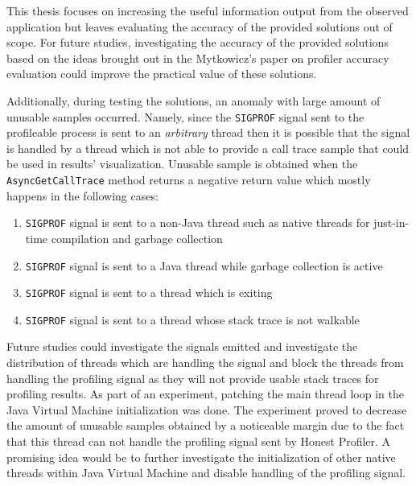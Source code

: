\documentclass[..thesis.tex]{subfiles}
\begin{document}
This thesis focuses on increasing the useful information output from the observed application but leaves evaluating the accuracy of the provided solutions out of scope. For future studies, investigating the accuracy of the provided solutions based on the ideas brought out in the Mytkowicz's paper on profiler accuracy evaluation \cite{mytkowicz_evaluating_2010} could improve the practical value of these solutions.


Additionally, during testing the solutions, an anomaly with large amount of unusable samples occurred. Namely, since the \texttt{SIGPROF} signal sent to the profileable process is sent to an \textit{arbitrary} thread then it is possible that the signal is handled by a thread which is not able to provide a call trace sample that could be used in results' visualization. Unusable sample is obtained when the \texttt{Async\-Get\-Call\-Trace} method returns a negative return value which mostly happens in the following cases:
\begin{enumerate}
	\item \texttt{SIGPROF} signal is sent to a non-Java thread such as native threads for just-in-time compilation and garbage collection
	\item \texttt{SIGPROF} signal is sent to a Java thread while garbage collection is active
	\item \texttt{SIGPROF} signal is sent to a thread which is exiting
	\item \texttt{SIGPROF} signal is sent to a thread whose stack trace is not walkable
\end{enumerate}

Future studies could investigate the signals emitted and investigate the distribution of threads which are handling the signal and block the threads from handling the profiling signal as they will not provide usable stack traces for profiling results.
As part of an experiment, patching the main thread loop in the Java Virtual Machine initialization was done. The experiment proved to decrease the amount of unusable samples obtained by a noticeable margin due to the fact that this thread can not handle the profiling signal sent by Honest Profiler. A promising idea would be to further investigate the initialization of other native threads within Java Virtual Machine and disable handling of the profiling signal.
\end{document}
